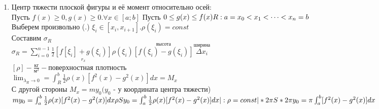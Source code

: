 \documentclass[12pt]{article}
\begin{document}
\begin{enumerate}
        \subsubsection*{Теорема 6.13.1  1-ая Теорема Гульдена}\label{th:6.13.1}
        Площадь поверхности, полученной вращением кривой относительно оси oX, равна длине этой кривой, умноженной на длину окружности, которую описывает центр тяжести вокруг оси oX.\par\noindent
        \underline{Доказательство:}
        \begin{adjustwidth}{1.5em}{1.5em}
            См. выше\\
            $\begin{cases}
                x_0=\frac{M_y}{m}\\
                y_0=\frac{M_x}{m}
            \end{cases} =
            \begin{cases}
                x_0=\frac{\int_{a}^{b}x\rho (x)\sqrt{1+f'(x)^2}dx}{\int_{a}^{b}\underset{\rho}{\rho (x)}\underset{dl}{\sqrt{1+f'(x)^2}dx}dx}\\
                y_0=\frac{\int_{a}^{b}y\rho (x)\sqrt{1+f'(x)^2}dx}{\int_{a}^{b}\rho (x)\sqrt{1+f'(x)^2}dx}
            \end{cases}$
        \end{adjustwidth}
        \item Центр тяжести плоской фигуры и её момент относительно осей:\\
        Пусть $f(x)\geq 0,g(x)\geq 0. \forall x \in [a;b]$
        Пусть $0 \leq g(x) \leq f(x)\\
        R:a=x_0<x_1<\dots<x_n=b$\\
        Выберем произвольно (.) $\xi_i\in [x_i,x_{i+1}]. \rho(\xi_i)=const$\\
        Составим $\sigma_R$\\
        $\sigma_R=\sum_{i=0}^{n-1}\frac{1}{2} \underset{r_x}{[f[\xi_i]+g(\xi_i)]}\rho(\xi_i)\overset{\text{высота}}{[f(\xi_i)-g(\xi_i)]}\overset{\text{ширина}}{\Delta x_i}$\\
        $[\rho]-\frac{\text{кг}}{\text{м}^2} - $поверхностная плотность\\
        $\lim_{\lambda_R \to 0} = \int_{R}^{b}\frac{1}{2}\rho (x) [f^2(x)-g^2(x)]dx=M_x$\\
        С другой стороны $M_x=my_0(y_0$ - у координата центра тяжести)\\
        \begin{math}
            my_0=\int_{a}^{b}\frac{1}{2}\rho (x)[f^2(x)-g^2(x)]dx\\
            \rho Sy_0=\int_{a}^{b}\frac{1}{2}\rho (x)[f^2(x)-g^2(x)]dx|:\rho=const|*2\pi\\
            S*2\pi y_0=\pi \int_{a}^{b} [f^2(x)-g^2(x)]dx\\
        \end{math}

\end{enumerate}
\end{document}
